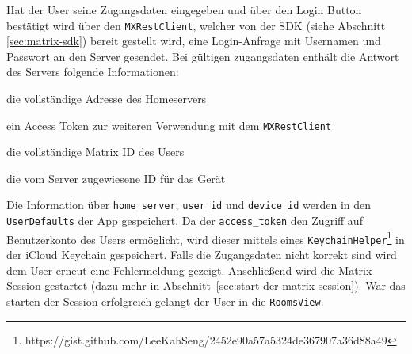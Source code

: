     Hat der User seine Zugangsdaten eingegeben und über den Login Button bestätigt wird über den \texttt{MXRestClient}, welcher von der SDK (siehe Abschnitt \ref{sec:matrix-sdk}) bereit gestellt wird, eine Login-Anfrage mit Usernamen und Passwort an den Server gesendet.
    Bei gültigen zugangsdaten enthält die Antwort des Servers folgende Informationen:
    \begin{description}[leftmargin=!,labelwidth=3cm]
        \item [home\_server] die vollständige Adresse des Homeservers
        \item [access\_token] ein Access Token zur weiteren Verwendung mit dem \texttt{MXRestClient}
        \item [user\_id] die vollständige Matrix ID des Users
        \item [device\_id] die vom Server zugewiesene ID für das Gerät
    \end{description}
    Die Information über \texttt{home\_server}, \texttt{user\_id} und \texttt{device\_id} werden in den \texttt{UserDefaults} der App gespeichert.
    Da der \texttt{access\_token} den Zugriff auf Benutzerkonto des Users ermöglicht, wird dieser mittels eines \texttt{KeychainHelper}\footnote{https://gist.github.com/LeeKahSeng/2452e90a57a5324de367907a36d88a49} in der iCloud Keychain gespeichert.
    Falls die Zugangsdaten nicht korrekt sind wird dem User erneut eine Fehlermeldung gezeigt.
    Anschließend wird die Matrix Session gestartet (dazu mehr in Abschnitt~\ref{sec:start-der-matrix-session}).
    War das starten der Session erfolgreich gelangt der User in die \texttt{RoomsView}.\\

